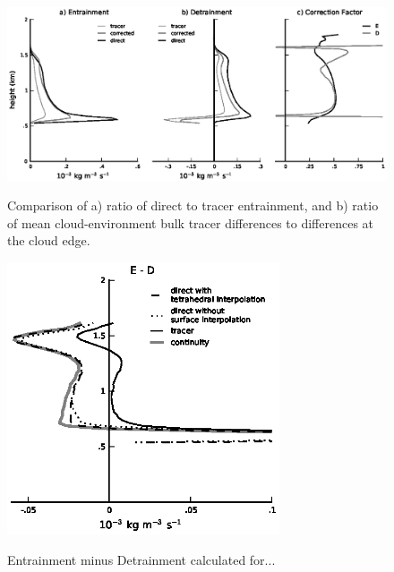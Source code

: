\documentclass[12pt]{article}
\begin{document}
\begin{figure}[t]
  \noindent\includegraphics[width=40pc,angle=0]{./figures/corrected_entrainment_core.eps}\\
  \caption{Comparison of a) ratio of direct to tracer entrainment, and b) ratio 
of mean cloud-environment bulk tracer differences to differences at the cloud 
edge.}\label{fig:corrected_entrainment}
\end{figure}

\begin{figure}[t]
  \noindent\includegraphics[width=19pc,angle=0]{./figures/E_minus_D_core.eps}\\
  \caption{Entrainment minus Detrainment calculated for...}\label{fig:E_minus_D}
\end{figure}
\end{document}
